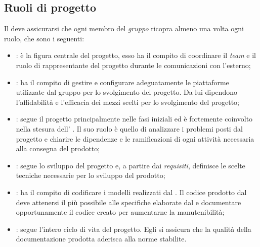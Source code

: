 \subsection{Ruoli di progetto} %
Il \RdP{} deve assicurarsi che ogni membro del \emph{gruppo} ricopra almeno una volta ogni ruolo, che sono i seguenti:
	\begin{itemize}
		\item \textbf{\RdP}: è la figura centrale del progetto, esso ha il compito di coordinare il \emph{team} e il ruolo di rappresentante del progetto durante le comunicazioni con l'esterno;
		\item \textbf{\Amm}: ha il compito di gestire e configurare adeguatamente le piattaforme utilizzate dal gruppo per lo svolgimento del progetto. Da lui dipendono l'affidabilità e l'efficacia dei mezzi scelti per lo svolgimento del progetto;
		\item \textbf{\Ana}: segue il progetto principalmente nelle fasi iniziali ed è fortemente coinvolto nella stesura dell' \AdR{}. Il suo ruolo è quello di analizzare i problemi posti dal progetto e chiarire le dipendenze e le ramificazioni di ogni attività necessaria alla consegna del prodotto;
		\item \textbf{\Prog}: segue lo sviluppo del progetto e, a partire dai \emph{requisiti}, definisce le scelte tecniche necessarie per lo sviluppo del prodotto;
		\item \textbf{\Progm}: ha il compito di codificare i modelli realizzati dal \Prog{}. Il codice prodotto dal \Progm{} deve attenersi il più possibile alle specifiche elaborate dal \Prog{} e documentare opportunamente il codice creato per aumentarne la manutenibilità;
		\item \textbf{\Ver}: segue l'intero ciclo di vita del progetto. Egli si assicura che la qualità della documentazione prodotta aderisca alla norme stabilite.
	\end{itemize}

